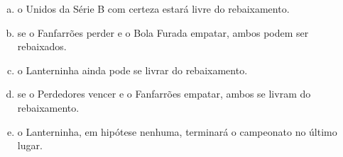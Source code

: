 \documentclass[a4paper,14pt]{article}
\begin{document}
\begin{multicols}{2}
\begin{enumerate}
\begin{itemize}
				\begin{enumerate}[a)]
					\item o Unidos da Série B com certeza estará livre do rebaixamento.
					\item se o Fanfarrões perder e o Bola Furada empatar, ambos podem ser rebaixados.
					\item o Lanterninha ainda pode se livrar do rebaixamento.
					\item se o Perdedores vencer e o Fanfarrões empatar, ambos se livram do rebaixamento.
					\item o Lanterninha, em hipótese nenhuma, terminará o campeonato no último lugar.
				\end{enumerate}
			\end{itemize}
		\end{enumerate}
		$~$ \\ $~$ \\ $~$ \\ $~$ \\ $~$ \\ $~$ \\ $~$ \\ $~$ \\ $~$ \\ $~$ \\ $~$ \\ $~$ \\ $~$ \\ $~$ \\ $~$ \\ $~$ \\ $~$ \\ $~$ \\ $~$ \\ $~$ \\ $~$ \\ $~$ \\ $~$ \\ $~$ \\ $~$ \\ $~$ \\ $~$ \\ $~$ \\ $~$ \\ $~$ \\ $~$ \\ $~$
	\end{multicols}
\end{document}
